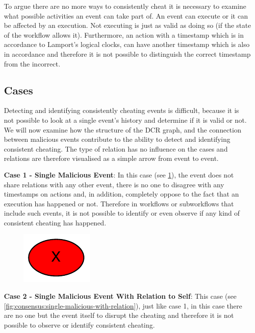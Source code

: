 	\newpar To argue there are no more ways to consistently cheat it is necessary to examine what possible activities an event can take part of. An event can execute or it can be affected by an execution. Not executing is just as valid as doing so (if the state of the workflow allows it). Furthermore, an action with a timestamp which is in accordance to Lamport's logical clocks, can have another timestamp which is also in accordance and therefore it is not possible to distinguish the correct timestamp from the incorrect. 
	
	\subsection{Cases}
	Detecting and identifying consistently cheating events is difficult, because it is not possible to look at a single event's history and determine if it is valid or not. We will now examine how the structure of the DCR graph, and the connection between malicious events contribute to the ability to detect and identifying consistent cheating. The type of relation has no influence on the cases and relations are therefore visualised as a simple arrow from event to event.
	
	\newpar \textbf{Case 1 - Single Malicious Event}: In this case (see \ref{fig:consensus:single-malicious}), the event does not share relations with any other event, there is no one to disagree with any timestamps on actions and, in addition, completely oppose to the fact that an execution has happened or not. Therefore in workflows or subworkflows that include such events, it is not possible to identify or even observe if any kind of consistent cheating has happened.
	
	\begin{figure}[H]
		\centering
		\includegraphics[]{5validation/images/1.pdf}
		\caption{}
		\label{fig:consensus:single-malicious}
	\end{figure}
	
	
	\newpar \textbf{Case 2 - Single Malicious Event With Relation to Self}: This case (see \ref{fig:consensus:single-malicious-with-relation}), just like case 1, in this case there are no one but the event itself to disrupt the cheating and therefore it is not possible to observe or identify consistent cheating.
	
